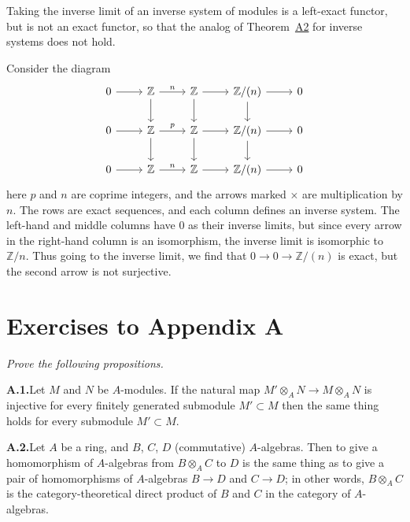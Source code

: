 Taking the inverse limit of an inverse system of modules is a left-exact
functor, but is not an exact functor, so that the analog of
Theorem~\hyperref[thm:A2]{A2} for inverse systems does not hold.

\begin{example*}
Consider the diagram
\[
\begin{tikzcd}
0 \arrow[r] & \mathbb{Z} \arrow[r, "n"] \arrow[d] & \mathbb{Z} \arrow[r] \arrow[d] & \mathbb{Z}/(n) \arrow[r] \arrow[d] & 0 \\
0 \arrow[r] & \mathbb{Z} \arrow[r, "p"] \arrow[d] & \mathbb{Z} \arrow[r] \arrow[d] & \mathbb{Z}/(n) \arrow[r] \arrow[d] & 0 \\
0 \arrow[r] & \mathbb{Z} \arrow[r, "n"] & \mathbb{Z} \arrow[r] & \mathbb{Z}/(n) \arrow[r] & 0
\end{tikzcd}
\]
here $p$ and $n$ are coprime integers, and the arrows marked $\times$ are multiplication
by $n$. The rows are exact sequences, and each column defines an inverse
system. The left-hand and middle columns have $0$ as their inverse limits, but
since every arrow in the right-hand column is an isomorphism, the inverse
limit is isomorphic to $\mathbb{Z}/n$. Thus going to the inverse limit, we find that
$0 \to 0 \to \mathbb{Z}/(n)$ is exact, but the second arrow is not surjective.
\end{example*}

\section*{Exercises to Appendix A}
\emph{Prove the following propositions.}

\noindent\textbf{A.1.}\quad Let $M$ and $N$ be $A$-modules. If the natural map
$M' \otimes_A N \to M \otimes_A N$ is injective for every finitely generated submodule
$M' \subset M$ then the same thing holds for every submodule $M' \subset M$.

\medskip
\noindent\textbf{A.2.}\quad Let $A$ be a ring, and $B$, $C$, $D$ (commutative) $A$-algebras. Then to
give a homomorphism of $A$-algebras from $B \otimes_A C$ to $D$ is the same thing as to
give a pair of homomorphisms of $A$-algebras $B \to D$ and $C \to D$; in other words,
$B \otimes_A C$ is the category-theoretical direct product of $B$ and $C$ in the category of
$A$-algebras.
